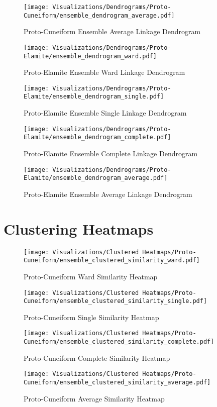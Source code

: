 \documentclass[11pt,a4paper,oneside]{report}
\begin{document}
\begin{figure}[H] 
    \centering
    \texttt{[image: Visualizations/Dendrograms/Proto-Cuneiform/ensemble\_dendrogram\_average.pdf]}
     \caption*{Proto-Cuneiform Ensemble Average Linkage Dendrogram}
\end{figure}


\begin{figure}[H] 
    \centering
    \texttt{[image: Visualizations/Dendrograms/Proto-Elamite/ensemble\_dendrogram\_ward.pdf]}
     \caption*{Proto-Elamite Ensemble Ward Linkage Dendrogram}
\end{figure}

\begin{figure}[H] 
    \centering
    \texttt{[image: Visualizations/Dendrograms/Proto-Elamite/ensemble\_dendrogram\_single.pdf]}
     \caption*{Proto-Elamite Ensemble Single Linkage Dendrogram}
\end{figure}

\begin{figure}[H] 
    \centering
    \texttt{[image: Visualizations/Dendrograms/Proto-Elamite/ensemble\_dendrogram\_complete.pdf]}
     \caption*{Proto-Elamite Ensemble Complete Linkage Dendrogram}
\end{figure}

\begin{figure}[H] 
    \centering
    \texttt{[image: Visualizations/Dendrograms/Proto-Elamite/ensemble\_dendrogram\_average.pdf]}
     \caption*{Proto-Elamite Ensemble Average Linkage Dendrogram}
\end{figure}

\section{Clustering Heatmaps}
\label{app: heatmaps}


\begin{figure}[H]
    \centering
    \texttt{[image: Visualizations/Clustered Heatmaps/Proto-Cuneiform/ensemble\_clustered\_similarity\_ward.pdf]}
     \caption*{Proto-Cuneiform Ward Similarity Heatmap}
\end{figure}
 \begin{figure}[H]
    \centering
    \texttt{[image: Visualizations/Clustered Heatmaps/Proto-Cuneiform/ensemble\_clustered\_similarity\_single.pdf]}
     \caption*{Proto-Cuneiform Single Similarity Heatmap}
\end{figure}
 \begin{figure}[H]
    \centering
    \texttt{[image: Visualizations/Clustered Heatmaps/Proto-Cuneiform/ensemble\_clustered\_similarity\_complete.pdf]}
     \caption*{Proto-Cuneiform Complete Similarity Heatmap}
\end{figure}
 \begin{figure}[H]
    \centering
    \texttt{[image: Visualizations/Clustered Heatmaps/Proto-Cuneiform/ensemble\_clustered\_similarity\_average.pdf]}
     \caption*{Proto-Cuneiform Average Similarity Heatmap}
\end{figure}
\end{document}
